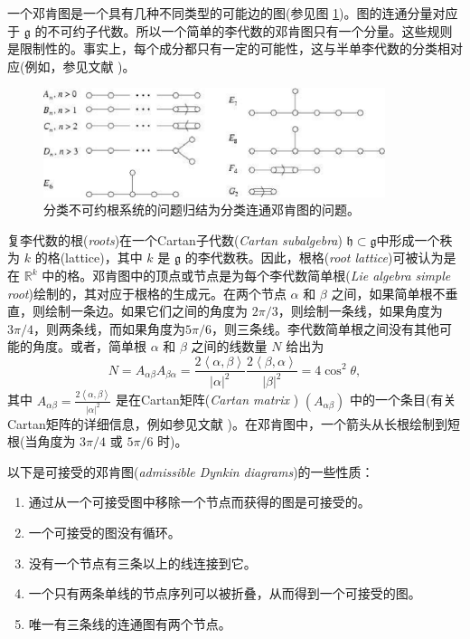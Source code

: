 \documentclass[11pt,fontset=founder]{ctexart}
\begin{document}
一个邓肯图是一个具有几种不同类型的可能边的图(参见图 \ref{Dynkin})。图的连通分量对应于 $\mathfrak{g}$ 的不可约子代数。所以一个简单的李代数的邓肯图只有一个分量。这些规则是限制性的。事实上，每个成分都只有一定的可能性，这与半单李代数的分类相对应(例如，参见文献 \cite{Conway})。

\begin{figure}[tbh]
\centerline{\includegraphics[width=10cm]{Dynkin}}
\caption{分类不可约根系统的问题归结为分类连通邓肯图的问题。}
\label{Dynkin}
\end{figure}

复李代数的根(\emph{roots})在一个Cartan子代数(\textit{Cartan subalgebra}) $\mathfrak{h\subset g}$中形成一个秩为 $k$ 的格(lattice)，其中 $k$ 是 $\mathfrak{g}$ 的李代数秩。因此，根格(\emph{root lattice})可被认为是在 $\mathbb{R}^{k}$ 中的格。邓肯图中的顶点或节点是为每个李代数简单根(\textit{Lie algebra simple root})绘制的，其对应于根格的生成元。在两个节点 $\alpha $ 和 $\beta $ 之间，如果简单根不垂直，则绘制一条边。如果它们之间的角度为 $2\pi /3$，则绘制一条线，如果角度为 $3\pi /4$，则两条线，而如果角度为$5\pi/6$，则三条线。李代数简单根之间没有其他可能的角度。或者，简单根 $\alpha $ 和 $\beta $ 之间的线数量 $N$ 给出为
\begin{equation*}
N=A_{\alpha \beta }A_{\beta \alpha }=\frac{2\left\langle \alpha ,\beta
\right\rangle }{|\alpha |^{2}}\frac{2\left\langle \beta ,\alpha
\right\rangle }{|\beta |^{2}}=4\cos ^{2}\theta ,
\end{equation*}%
其中 $A_{\alpha \beta }=\frac{2\left\langle \alpha ,\beta \right\rangle }{ |\alpha |^{2}}$ 是在Cartan矩阵(\emph{Cartan matrix }) $(A_{\alpha \beta }) $ 中的一个条目(有关Cartan矩阵的详细信息，例如参见文献 \cite{Helgason})。在邓肯图中，一个箭头从长根绘制到短根(当角度为 $3\pi /4$ 或 $5\pi /6$ 时)。

以下是可接受的邓肯图(\textit{admissible Dynkin diagrams})的一些性质：

\begin{enumerate}
\item 通过从一个可接受图中移除一个节点而获得的图是可接受的。

\item 一个可接受的图没有循环。

\item 没有一个节点有三条以上的线连接到它。

\item 一个只有两条单线的节点序列可以被折叠，从而得到一个可接受的图。

\item 唯一有三条线的连通图有两个节点。
\end{enumerate}
\end{document}
